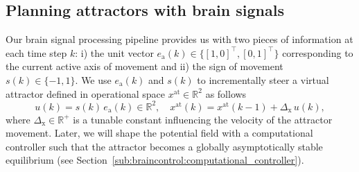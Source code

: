 
\subsection{Planning attractors with brain signals}\label{sub:braincontrol:planning_attractors_switching}
Our brain signal processing pipeline provides us with two pieces of information at each time step $k$: i) the unit vector $e_\mathrm{a}(k) \in \{ [1, 0]^\top, [0, 1]^\top \}$ corresponding to the current active axis of movement %
and ii) the sign of movement $s(k) \in \{ -1, 1 \}$. We use $e_\mathrm{a}(k)$ and $s(k)$ to incrementally steer a virtual attractor defined in operational space $x^\mathrm{at} \in \mathbb{R}^2$ as follows
%
\begin{equation}
    u(k) = s(k) \, e_\mathrm{a}(k) \in \mathbb{R}^2, \quad  x^\mathrm{at}(k) = x^\mathrm{at}(k-1) + \Delta_\mathrm{x} \, u(k),
\end{equation}
where $\Delta_\mathrm{x} \in \mathbb{R}^+$ is a tunable constant influencing the velocity of the attractor movement.
%
Later, we will shape the potential field with a computational controller such that the attractor becomes a globally asymptotically stable equilibrium (see Section~\ref{sub:braincontrol:computational_controller}).

